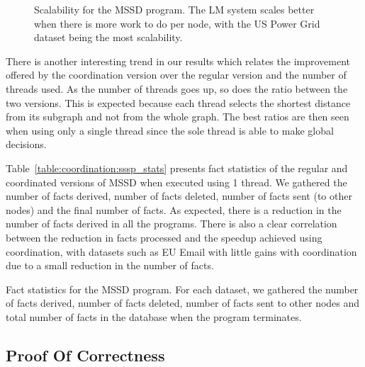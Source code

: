 \begin{figure}[]
        \caption{Scalability for the MSSD program. The LM system scales better
        when there is more work to do per node, with the US Power Grid dataset being the
        most scalability.}

        \label{fig:coordination:results_sssp}
\end{figure}

There is another interesting trend in our results which relates the improvement
offered by the coordination version over the regular version and the number of
threads used. As the number of threads goes up, so does the ratio between the
two versions. This is expected because each thread selects the shortest distance
from its subgraph and not from the whole graph. The best ratios are then seen
when using only a single thread since the sole thread is able to make global
decisions.

Table~\ref{table:coordination:sssp_stats} presents fact statistics of the
regular and coordinated versions of MSSD when executed using 1 thread. We
gathered the number of facts derived, number of facts deleted, number of facts
sent (to other nodes) and the final number of facts. As expected, there is a
reduction in the number of facts derived in all the programs. There is also a
clear correlation between the reduction in facts processed and the speedup
achieved using coordination, with datasets such as EU Email with little gains
with coordination due to a small reduction in the number of facts.

\begin{table}[ht]
   \begin{center}
      
   \end{center}
   \caption{Fact statistics for the MSSD program. For each dataset, we gathered
   the number of facts derived, number of facts deleted, number of facts sent to
other nodes and total number of facts in the database when the program
terminates.}
   \label{table:coordination:sssp_stats}
\end{table}



\subsection{Proof Of Correctness}


